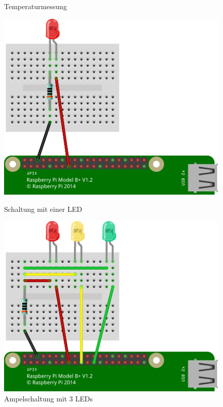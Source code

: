 \documentclass{\VorlagenPfad/coderdojokatext}
\begin{document}
\begin{figure}[htb]
\begin{minipage}[t]{0.45\linewidth}
		\caption{Temperaturmessung}
	\end{minipage}
\end{figure}



\begin{figure}[htb]
	\centering
	\begin{minipage}[t]{0.45\linewidth}
		\centering
		\includegraphics[width=.9\textwidth]{ampel/eine_led_bb.png}
		\caption{Schaltung mit einer LED}
	\end{minipage}%
	\hfill
	\begin{minipage}[t]{0.45\linewidth}
		\centering
		\includegraphics[width=.9\textwidth]{ampel/ampel_bb.png}
		\caption{Ampelschaltung mit 3 LEDs}
	\end{minipage}
\end{figure}
\end{document}
